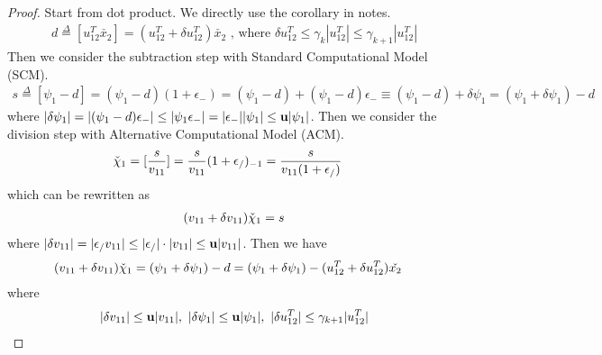 \documentclass[11pt,a4paper]{article}
\begin{document}
\subsection{}
\begin{proof}
Start from dot product. We directly use the corollary in notes. 
\begin{align}
    d \overset{\Delta}{=} [u_{12}^T \check{x_2}] = (u_{12}^T + \delta u_{12}^T) \check{x_2}
    \text{ , where } \delta u_{12}^T \leq \gamma_k |u_{12}^T| \leq \gamma_{k+1} |u_{12}^T|
\end{align}
Then we consider the subtraction step with Standard Computational Model (SCM).
\begin{align}
    s \overset{\Delta}{=} [\psi_1 - d] 
    = (\psi_1 - d) (1+\epsilon_-)
    = (\psi_1 - d) + (\psi_1 - d) \epsilon_-
    \equiv (\psi_1 - d) + \delta \psi_1 
    = (\psi_1 + \delta \psi_1 ) - d
\end{align}
where 
$|\delta \psi_1| = |(\psi_1 - d) \epsilon_-| \leq | \psi_1  \epsilon_-|
    =  |\epsilon_-| | \psi_1 | \leq \mathbf{u} |\psi_1| $.
Then we consider the division step with Alternative Computational Model (ACM).
\begin{align}
    &\check{\chi}_1 = [\frac{s}{v_{11}}]  = \frac{s}{v_{11}} (1+\epsilon_/)_{-1} 
    =  \frac{s}{v_{11}(1+\epsilon_/)}
\end{align}
which can be rewritten as  
\begin{align}
    (v_{11}+\delta v_{11}) \check{\chi}_1  = s
\end{align}
where $ |\delta v_{11}| = |\epsilon_/ v_{11}| \leq |\epsilon_/|\cdot |v_{11}| \leq \mathbf{u} |v_{11}| $.
Then we have 
\begin{align}
    (v_{11}+\delta v_{11}) \check{\chi}_1  
    &= (\psi_1 + \delta \psi_1 ) - d  
    = (\psi_1 + \delta \psi_1 ) - (u_{12}^T + \delta u_{12}^T) \check{x_2}
\end{align}
where 
\begin{align}
    |\delta v_{11}| \leq \bu  |v_{11}|,\ 
    |\delta \psi_1| \leq \bu |\psi_1|,\ 
    |\delta u_{12}^T| \leq \gamma_{k+1}|u_{12}^T|
\end{align}
\end{proof}

\newpage
\end{document}
